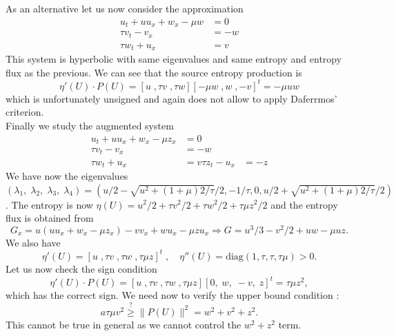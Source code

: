 \documentclass{article}
\theoremstyle{plain}
\theoremstyle{definition}
\numberwithin{theorem}{section}
\begin{document}
As an alternative let us now consider the approximation
\begin{subequations} \label{vkdvh2}
\begin{align}
    u_t + u u_x  + w_x -\mu w & = 0 \\
    \tau v_t - v_x & = -w\\
        \tau w_t +  u_x & = v
\end{align}
\end{subequations}
This system is hyperbolic with  same eigenvalues  and same entropy and entropy flux as the previous.
We can see that  the source entropy production is
$$
\eta'(U)\cdot P(U) = [u\;, \tau v\;, \tau w] [-\mu w\;, w\;, -v]^t =- \mu u w
$$
which is unfortunately unsigned and again does not allow to apply Daferrmos' criterion.\\



Finally we  study   the augmented system
\begin{subequations} \label{vkdvh3}
\begin{align}
    u_t +  u u_x  + w_x -\mu z_x & = 0 \\
    \tau v_t - v_x & = -w\\
        \tau w_t  + u_x  & = v
            \tau z_t - u_x & = -z
\end{align}
\end{subequations}
We have now the eigenvalues $(\lambda_1,\;\lambda_2,\;\lambda_3,\;\lambda_4)=(u/2 - \sqrt{u^2+(1+\mu)2/\tau}/2, -1/\tau, 0 , u/2 + \sqrt{u^2+(1+\mu)2/\tau}/2)$.
The entropy is now $\eta(U) =u^2/2 + \tau v^2/2 + \tau w^2/2 +\tau  \mu  z^2/2$ and the entropy flux is obtained from
$$
G_x = u( u u_x  + w_x -\mu z_x) - vv_x +wu_x -\mu z u_x  \Rightarrow  G =u^3/3  -v^2/2 + uw -\mu uz.
$$
We also have
$$
\eta'(U)= [u\;, \tau v\;, \tau w\;, \tau\mu z]^t\;,\quad
\eta''(U) =  \text{diag}(1,\tau,\tau,\tau \mu) >0.
$$
Let us now check the  sign  condition
$$
\eta'(U)\cdot P(U) = [u\;, \tau v\;, \tau w\;, \tau\mu z] [ 0,\; w,\; -v,\; z ]^t = \tau \mu z^2 ,
$$
which has the correct sign. We need now to verify the upper bound  condition :
$$
  a \tau \mu   v^2 \stackrel{?}{\ge} \|P(U)\|^2 = w^2 + v^2 + z^2 .
$$
This cannot be true in general as we cannot control the $w^2 + z^2$ term.
\end{document}
